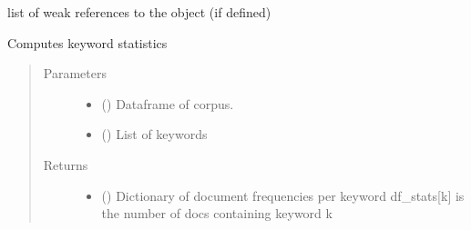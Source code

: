 \documentclass[letterpaper,10pt,english]{sphinxmanual}
\begin{document}
\begin{fulllineitems}
\begin{fulllineitems}
\begin{quote}
\begin{description}
\begin{itemize}
\end{itemize}

\end{description}\end{quote}

\end{fulllineitems}


\begin{fulllineitems}
\label{\detokenize{dc_preprocessor:src.domain_classifier.preprocessor.CorpusDFProcessor.__weakref__}}
\sphinxAtStartPar
list of weak references to the object (if defined)

\end{fulllineitems}


\begin{fulllineitems}
\label{\detokenize{dc_preprocessor:src.domain_classifier.preprocessor.CorpusDFProcessor.compute_keyword_stats}}
\sphinxAtStartPar
Computes keyword statistics
\begin{quote}\begin{description}
\item[{Parameters}] \leavevmode\begin{itemize}
\item {} 
\sphinxAtStartPar
{} () \textendash{} Dataframe of corpus.

\item {} 
\sphinxAtStartPar
{} () \textendash{} List of keywords

\end{itemize}

\item[{Returns}] \leavevmode
\sphinxAtStartPar
\begin{itemize}
\item {} 
\sphinxAtStartPar
{} () \textendash{} Dictionary of document frequencies per keyword
df\_stats{[}k{]} is the number of docs containing keyword k


\end{itemize}
\end{description}
\end{quote}
\end{fulllineitems}
\end{fulllineitems}
\end{document}
